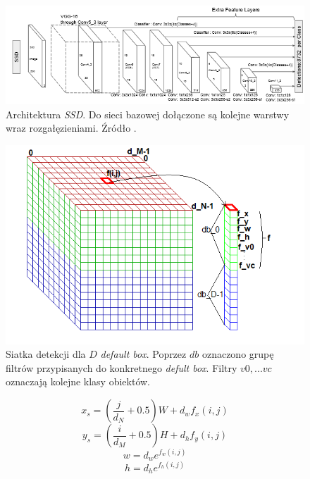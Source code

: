 \begin{figure}
    \centering
    \includegraphics[width=0.9\linewidth]{images/ssd_img.png}
    \caption{Architektura \emph{SSD}. Do sieci bazowej dołączone są kolejne warstwy wraz rozgałęzieniami.
    Źródło \cite{ssd}.}
    \label{fig:ssd_arch}
\end{figure}
\begin{figure}
    \centering
    \includegraphics[width=0.9\linewidth]{images/ssd_grid_marked.png}
    \caption{Siatka detekcji dla $D$ \emph{default box}. Poprzez $db$ oznaczono grupę filtrów przypisanych do konkretnego \emph{defult box}. Filtry $v0,...vc$ oznaczają kolejne klasy obiektów.}
    \label{fig:ssd_grid}
\end{figure}

\begin{equation}
x_s = (\frac{j}{d_N}+ 0.5)W + d_w f_x(i,j)
\label{eq:xs_ssd}
\end{equation}
\begin{equation}
y_s = (\frac{i}{d_M}+ 0.5)H + d_h f_y(i,j)
\label{eq:ys_ssd}
\end{equation}
\begin{equation}
w = d_we^{f_w(i,j)}
\label{eq:w_ssd}
\end{equation}
\begin{equation}
h = d_he^{f_h(i,j)}
\label{eq:h_ssd}
\end{equation}

